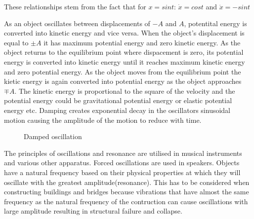 \documentclass[a4,8pt]{article}
\begin{document}
These relationships stem from the fact that for $x=sint$: $\dot{x}=cost$ and $\ddot{x}=-sint$

As an object oscillates between displacements of $-A$ and $A$, potentital energy is converted into kinetic energy and vice versa. When the object's displacement is equal to $\pm A$ it has maximum potential energy and zero kinetic energy. As the object returns to the equilibrium point where dispacement is zero, its potential energy  is converted into kinetic energy until it reaches maximum kinetic energy and zero potential energy. As the object moves from the equilibrium point the kietic energy is again converted into potential energy as the object approaches $\mp A$. The kinetic energy is proportional to the square of the velocity and the potential energy could be gravitational potential energy or elastic potential energy etc. 
Damping creates exponential decay in the oscillators sinusoidal motion causing the amplitude of the motion to reduce with time.

\begin{figure}[h]
\begin{center}
\end{center}
\caption{Damped oscillation}
\end{figure}

The principles of oscillations and resonance are utilised in musical instruments and various other apparatus. Forced oscillations are used in speakers. Objects have a natural frequency based on their physical properties at which they will oscillate with the greatest amplitude(resonance). This has to be considered when constructing buildings and bridges because vibrations that have almost the same frequency as the natural frequency of the contruction can cause oscillations with large amplitude resulting in structural failure and collapse.
\end{document}
